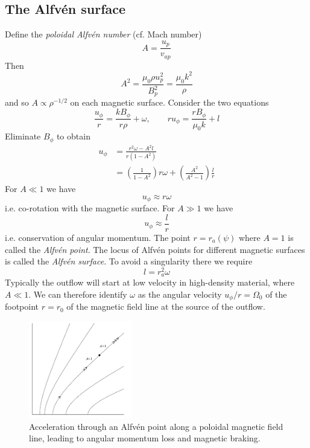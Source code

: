 \documentclass{jknotes}
\begin{document}
\subsection{The Alfv\'{e}n surface}
Define the \emph{poloidal Alfv\'{e}n number} (cf. Mach number)
\begin{equation}
	A = \frac{u_p}{v_{ap}}
\end{equation}
Then
\begin{equation}
	A^2 = \frac{\mu_0 \rho u_p^2}{B_p^2} = \frac{\mu_0 k^2}{\rho}
\end{equation}
and so $A \propto \rho^{-1/2}$ on each magnetic surface. Consider the two
equations
\begin{equation}
	\frac{u_\phi}{r} = \frac{k B_\phi}{r\rho} + \omega, \hspace{2em} ru_\phi =
	\frac{r B_\phi}{\mu_0 k} + l
\end{equation}
Eliminate $B_\phi$ to obtain
\begin{align}
	u_\phi &= \frac{r^2 \omega - A^2 l}{r(1-A^2)} \\
		   &= \left(\frac{1}{1-A^2}\right)r\omega + \left(\frac{A^2}{A^2
		   -1}\right) \frac{l}{r}
\end{align}
For $A \ll 1$ we have
\begin{equation}
	u_\phi \approx r \omega
\end{equation}
i.e. co-rotation with the magnetic surface. For $A \gg 1$ we have
\begin{equation}
	u_\phi \approx \frac{l}{r}
\end{equation}
i.e. conservation of angular momentum.
The point $r = r_a(\psi)$ where $A=1$ is called the \emph{Alfv\'{e}n point}.
The locus of Alfv\'{e}n points for different magnetic surfaces is called the
\emph{Alfv\'{e}n surface}. To avoid a singularity there we require 
\begin{equation}
	l = r_a^2 \omega
\end{equation}
Typically the outflow will start at low velocity in high-density material,
where $A \ll 1$. We can therefore identify $\omega$ as the angular velocity
$u_\phi/r = \Omega_0$ of the footpoint $r=r_0$ of the magnetic field line at
the source of the outflow. 

\begin{figure}[h]
	\centering
	\includegraphics[width=0.4\textwidth]{astro_jet.png}
	\caption{Acceleration through an Alfv\'{e}n point along a poloidal
		magnetic field line, leading to angular momentum loss and magnetic
	braking.}
\end{figure}
\end{document}
